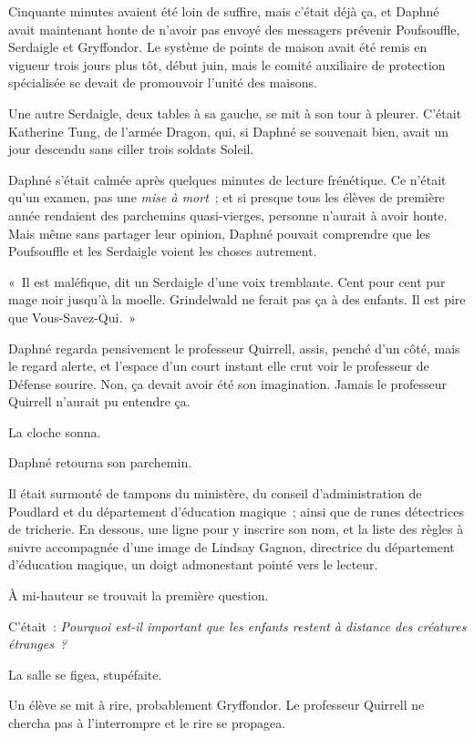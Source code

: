 Cinquante minutes avaient été loin de suffire, mais c'était déjà ça, et Daphné avait maintenant honte de n'avoir pas envoyé des messagers prévenir Poufsouffle, Serdaigle et Gryffondor.
Le système de points de maison avait été remis en vigueur trois jours plus tôt, début juin, mais le comité auxiliaire de protection spécialisée se devait de promouvoir l'unité des maisons.

Une autre Serdaigle, deux tables à sa gauche, se mit à son tour à pleurer.
C'était Katherine Tung, de l'armée Dragon, qui, si Daphné se souvenait bien, avait un jour descendu sans ciller trois soldats Soleil.

Daphné s'était calmée après quelques minutes de lecture frénétique.
Ce n'était qu'un examen, pas une \emph{mise à mort}~; et si presque tous les élèves de première année rendaient des parchemins quasi-vierges, personne n'aurait à avoir honte.
Mais même sans partager leur opinion, Daphné pouvait comprendre que les Poufsouffle et les Serdaigle voient les choses autrement.

«~Il est maléfique, dit un Serdaigle d'une voix tremblante.
Cent pour cent pur mage noir jusqu'à la moelle.
Grindelwald ne ferait pas ça à des enfants.
Il est pire que Vous-Savez-Qui.~»

Daphné regarda pensivement le professeur Quirrell, assis, penché d'un côté, mais le regard alerte, et l'espace d'un court instant elle crut voir le professeur de Défense sourire.
Non, ça devait avoir été son imagination.
Jamais le professeur Quirrell n'aurait pu entendre ça.

La cloche sonna.

Daphné retourna son parchemin.

Il était surmonté de tampons du ministère, du conseil d'administration de Poudlard et du département d'éducation magique~; ainsi que de runes détectrices de tricherie.
En dessous, une ligne pour y inscrire son nom, et la liste des règles à suivre accompagnée d'une image de Lindsay Gagnon, directrice du département d'éducation magique, un doigt admonestant pointé vers le lecteur.

À mi-hauteur se trouvait la première question.

C'était~: \emph{Pourquoi est-il important que les enfants restent à distance des créatures étranges~?}

La salle se figea, stupéfaite.

Un élève se mit à rire, probablement Gryffondor.
Le professeur Quirrell ne chercha pas à l'interrompre et le rire se propagea.

